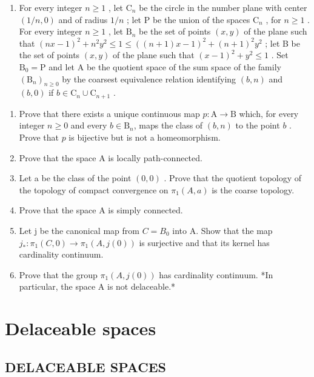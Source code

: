 \begin{enumerate}
\def\labelenumi{\arabic{enumi})}
\setcounter{enumi}{9}
\tightlist
\item
  For every integer \(n \geqslant 1\) , let \(\mathrm{C}_n\) be the circle in the number plane with center \((1/n,0)\) and of radius \(1/n\) ; let P be the union of the spaces \(\mathrm{C}_n\) , for \(n \geqslant 1\) . For every integer \(n \geqslant 1\) , let \(\mathrm{B}_n\) be the set of points \((x,y)\) of the plane such that \((nx-1)^2 + n^2y^2 \leqslant 1 \leqslant ((n+1)x-1)^2 + (n+1)^2y^2\) ; let B be the set of points \((x,y)\) of the plane such that \((x-1)^2 + y^2 \leqslant 1\) . Set \(\mathrm{B}_0 = \mathrm{P}\) and let A be the quotient space of the sum space of the family \((\mathrm{B}_n)_{n \geqslant 0}\) by the coarsest equivalence relation identifying \((b,n)\) and \((b,0)\) if \(b \in \mathrm{C}_n \cup \mathrm{C}_{n+1}\) .
\end{enumerate}

\begin{enumerate}
\def\labelenumi{\alph{enumi})}
\item
  Prove that there exists a unique continuous map \(p \colon \mathrm{A} \to \mathrm{B}\) which, for every integer \(n \geqslant 0\) and every \(b \in \mathrm{B}_n\), maps the class of \((b, n)\) to the point \(b\) . Prove that \(p\) is bijective but is not a homeomorphism.
\item
  Prove that the space A is locally path-connected.
\item
  Let a be the class of the point \((0,0)\) . Prove that the quotient topology of the topology of compact convergence on \(\pi_{1}(A,a)\) is the coarse topology.
\item
  Prove that the space A is simply connected.
\item
  Let j be the canonical map from \(C = B_{0}\) into A. Show that the map \(j_{*} \colon \pi_{1}(C,0) \to \pi_{1}(A,j(0))\) is surjective and that its kernel has cardinality continuum.
\item
  Prove that the group \(\pi_{1}(A,j(0))\) has cardinality continuum. *In particular, the space A is not delaceable.*
\end{enumerate}

\chapter{Delaceable spaces}

\section{DELACEABLE SPACES}

